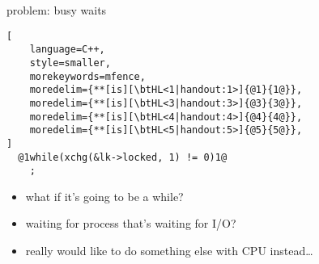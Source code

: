 \begin{frame}[fragile,label=problemBusyWaits]{problem: busy waits}
\begin{lstlisting}[
    language=C++,
    style=smaller,
    morekeywords=mfence,
    moredelim={**[is][\btHL<1|handout:1>]{@1}{1@}},
    moredelim={**[is][\btHL<3|handout:3>]{@3}{3@}},
    moredelim={**[is][\btHL<4|handout:4>]{@4}{4@}},
    moredelim={**[is][\btHL<5|handout:5>]{@5}{5@}},
]
  @1while(xchg(&lk->locked, 1) != 0)1@
    ; 
\end{lstlisting}
\begin{itemize}
    \item what if it's going to be a while?
    \item waiting for process that's waiting for I/O?
    \item really would like to do something else with CPU instead\ldots
\end{itemize}
\end{frame}
